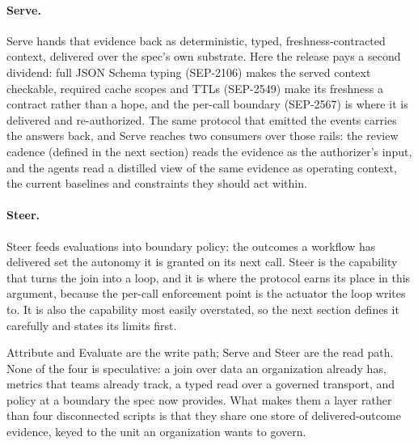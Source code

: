 \paragraph{Serve.} Serve hands that evidence back as deterministic, typed,
freshness-contracted context, delivered over the spec's own substrate. Here the
release pays a second dividend: full JSON Schema typing (SEP-2106) makes the
served context checkable, required cache scopes and TTLs (SEP-2549) make its
freshness a contract rather than a hope, and the per-call boundary (SEP-2567) is
where it is delivered and re-authorized. The same protocol that emitted the
events carries the answers back, and Serve reaches two consumers over those rails:
the review cadence (defined in the next section) reads the evidence as the
authorizer's input, and the agents
read a distilled view of the same evidence as operating context, the current
baselines and constraints they should act within.

\paragraph{Steer.} Steer feeds evaluations into boundary policy: the outcomes a
workflow has delivered set the autonomy it is granted on its next call.
Steer is the capability that turns the join into a loop, and it is where the
protocol earns its place in this argument, because the per-call enforcement point
is the actuator the loop writes to. It is also the capability most easily
overstated, so the next section defines it carefully and states its limits first.

Attribute and Evaluate are the write path; Serve and Steer are the read path.
None of the four is speculative: a join over data an organization already has,
metrics that teams already track, a typed read over a governed transport, and policy
at a boundary the spec now provides. What makes them a layer rather than four
disconnected scripts is that they share one store of delivered-outcome evidence,
keyed to the unit an organization wants to govern.

